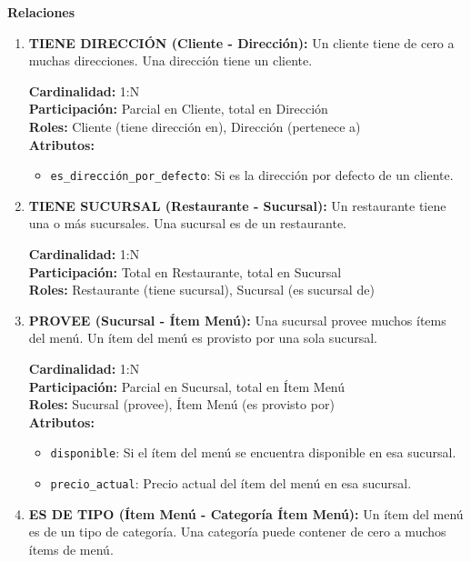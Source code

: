 \textbf{Relaciones}
\begin{enumerate}
    \item \textbf{TIENE DIRECCIÓN (Cliente - Dirección):} Un cliente tiene de cero a muchas direcciones. Una dirección tiene un cliente.

    \textbf{Cardinalidad:} 1:N \\
    \textbf{Participación:} Parcial en Cliente, total en Dirección \\
    \textbf{Roles:} Cliente (tiene dirección en), Dirección (pertenece a) \\
    \textbf{Atributos:}
    \begin{itemize}
        \item \texttt{es\_dirección\_por\_defecto}: Si es la dirección por defecto de un cliente.
    \end{itemize}

    \item \textbf{TIENE SUCURSAL (Restaurante - Sucursal):} Un restaurante tiene una o más sucursales. Una sucursal es de un restaurante.

    \textbf{Cardinalidad:} 1:N \\
    \textbf{Participación:} Total en Restaurante, total en Sucursal \\
    \textbf{Roles:} Restaurante (tiene sucursal), Sucursal (es sucursal de)

    \item \textbf{PROVEE (Sucursal - Ítem Menú):} Una sucursal provee muchos ítems del menú. Un ítem del menú es provisto por una sola sucursal.

    \textbf{Cardinalidad:} 1:N \\
    \textbf{Participación:} Parcial en Sucursal, total en Ítem Menú \\
    \textbf{Roles:} Sucursal (provee), Ítem Menú (es provisto por) \\
    \textbf{Atributos:}
    \begin{itemize}
        \item \texttt{disponible}: Si el ítem del menú se encuentra disponible en esa sucursal.
        \item \texttt{precio\_actual}: Precio actual del ítem del menú en esa sucursal.
    \end{itemize}

    \item \textbf{ES DE TIPO (Ítem Menú - Categoría Ítem Menú):} Un ítem del menú es de un tipo de categoría. Una categoría puede contener de cero a muchos ítems de menú.


\end{enumerate}
